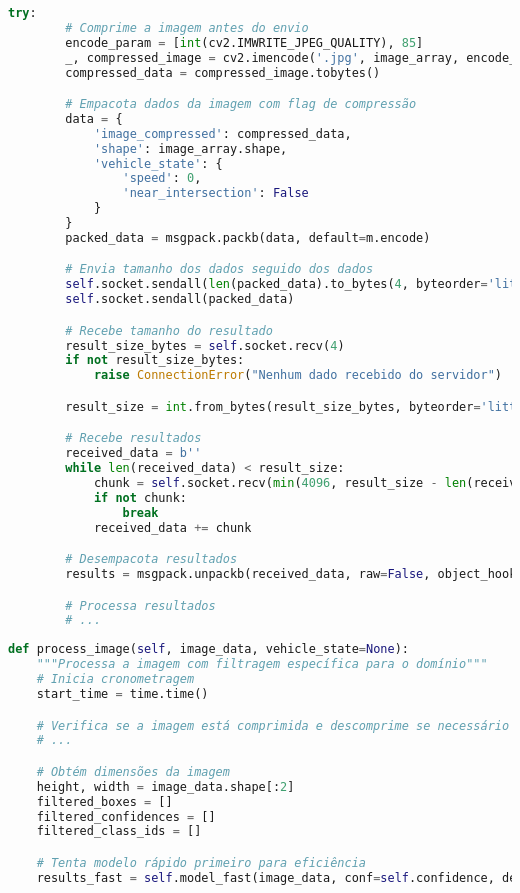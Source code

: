 \documentclass[
	12pt,				%
	oneside, %
	a4paper,			%
	english,			%
	french,				%
	spanish,			%
	brazil				%
	]{abntex2}
\begin{document}
\begin{apendicesenv}
\begin{lstlisting}[language=Python, caption=Método de detecção de objetos do cliente., label=lst:detector_client_detect]
    try:
        # Comprime a imagem antes do envio
        encode_param = [int(cv2.IMWRITE_JPEG_QUALITY), 85]
        _, compressed_image = cv2.imencode('.jpg', image_array, encode_param)
        compressed_data = compressed_image.tobytes()

        # Empacota dados da imagem com flag de compressão
        data = {
            'image_compressed': compressed_data,
            'shape': image_array.shape,
            'vehicle_state': {
                'speed': 0,
                'near_intersection': False
            }
        }
        packed_data = msgpack.packb(data, default=m.encode)

        # Envia tamanho dos dados seguido dos dados
        self.socket.sendall(len(packed_data).to_bytes(4, byteorder='little'))
        self.socket.sendall(packed_data)

        # Recebe tamanho do resultado
        result_size_bytes = self.socket.recv(4)
        if not result_size_bytes:
            raise ConnectionError("Nenhum dado recebido do servidor")

        result_size = int.from_bytes(result_size_bytes, byteorder='little')

        # Recebe resultados
        received_data = b''
        while len(received_data) < result_size:
            chunk = self.socket.recv(min(4096, result_size - len(received_data)))
            if not chunk:
                break
            received_data += chunk

        # Desempacota resultados
        results = msgpack.unpackb(received_data, raw=False, object_hook=m.decode)

        # Processa resultados
        # ...
\end{lstlisting}

\begin{lstlisting}[language=Python, caption=Processamento de imagens no servidor com YOLOv8., label=lst:server_process_image]
def process_image(self, image_data, vehicle_state=None):
    """Processa a imagem com filtragem específica para o domínio"""
    # Inicia cronometragem
    start_time = time.time()

    # Verifica se a imagem está comprimida e descomprime se necessário
    # ...

    # Obtém dimensões da imagem
    height, width = image_data.shape[:2]
    filtered_boxes = []
    filtered_confidences = []
    filtered_class_ids = []

    # Tenta modelo rápido primeiro para eficiência
    results_fast = self.model_fast(image_data, conf=self.confidence, device=self.device)


\end{lstlisting}
\end{apendicesenv}
\end{document}
